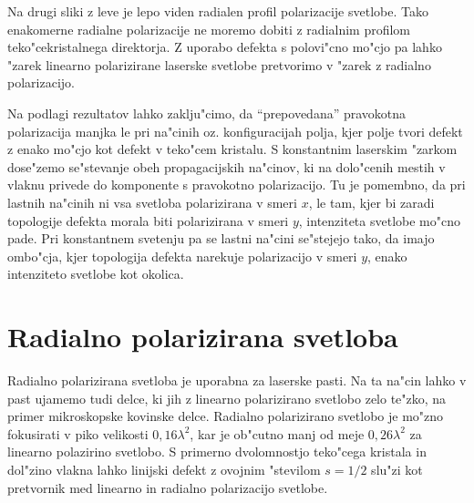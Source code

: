 \documentclass[a4paper,10pt]{article}
\begin{document}
Na drugi sliki z leve je lepo viden radialen profil polarizacije svetlobe. 
Tako enakomerne radialne polarizacije ne moremo dobiti z radialnim profilom teko"cekristalnega direktorja. 
Z uporabo defekta s polovi"cno mo"cjo pa lahko "zarek linearno polarizirane laserske svetlobe pretvorimo v "zarek z radialno polarizacijo. 

Na podlagi rezultatov lahko zaklju"cimo, da ``prepovedana'' pravokotna polarizacija manjka le pri na"cinih oz. konfiguracijah polja, kjer polje tvori defekt z enako mo"cjo kot defekt v teko"cem kristalu. 
S konstantnim laserskim "zarkom dose"zemo se"stevanje obeh propagacijskih na"cinov, ki na dolo"cenih mestih v vlaknu privede do komponente s pravokotno polarizacijo. 
Tu je pomembno, da pri lastnih na"cinih ni vsa svetloba polarizirana v smeri $x$, le tam, kjer bi zaradi topologije defekta morala biti polarizirana v smeri $y$, intenziteta svetlobe mo"cno pade. 
Pri konstantnem svetenju pa se lastni na"cini se"stejejo tako, da imajo ombo"cja, kjer topologija defekta narekuje polarizacijo v smeri $y$, enako intenziteto svetlobe kot okolica. 

\section{Radialno polarizirana svetloba}
Radialno polarizirana svetloba je uporabna za laserske pasti. 
Na ta na"cin lahko v past ujamemo tudi delce, ki jih z linearno polarizirano svetlobo zelo te"zko, na primer mikroskopske kovinske delce\cite{radial-trap}.
Radialno polarizirano svetlobo je mo"zno fokusirati v piko velikosti $0,\!16\lambda^2$, kar je ob"cutno manj od meje $0,\!26\lambda^2$ za linearno polazirino svetlobo\cite{radial-focus}. 
S primerno dvolomnostjo teko"cega kristala in dol"zino vlakna lahko linijski defekt z ovojnim "stevilom $s=1/2$ slu"zi kot pretvornik med linearno in radialno polarizacijo svetlobe. 
\end{document}
